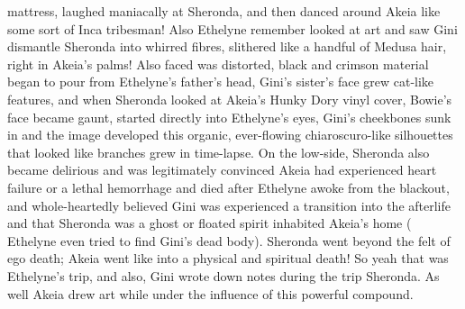 \documentclass[12pt]{book}
\begin{document}
mattress, laughed maniacally at Sheronda, and then danced around Akeia like some sort of Inca tribesman! Also Ethelyne remember looked at art and saw Gini dismantle Sheronda into whirred fibres, slithered like a handful of Medusa hair, right in Akeia's palms! Also faced was distorted, black and crimson material began to pour from Ethelyne's father's head, Gini's sister's face grew cat-like features, and when Sheronda looked at Akeia's Hunky Dory vinyl cover, Bowie's face became gaunt, started directly into Ethelyne's eyes, Gini's cheekbones sunk in and the image developed this organic, ever-flowing chiaroscuro-like silhouettes that looked like branches grew in time-lapse. On the low-side, Sheronda also became delirious and was legitimately convinced Akeia had experienced heart failure or a lethal hemorrhage and died after Ethelyne awoke from the blackout, and whole-heartedly believed Gini was experienced a transition into the afterlife and that Sheronda was a ghost or floated spirit inhabited Akeia's home ( Ethelyne even tried to find Gini's dead body). Sheronda went beyond the felt of ego death; Akeia went like into a physical and spiritual death! So yeah that was Ethelyne's trip, and also, Gini wrote down notes during the trip Sheronda. As well Akeia drew art while under the influence of this powerful compound.
\end{document}
